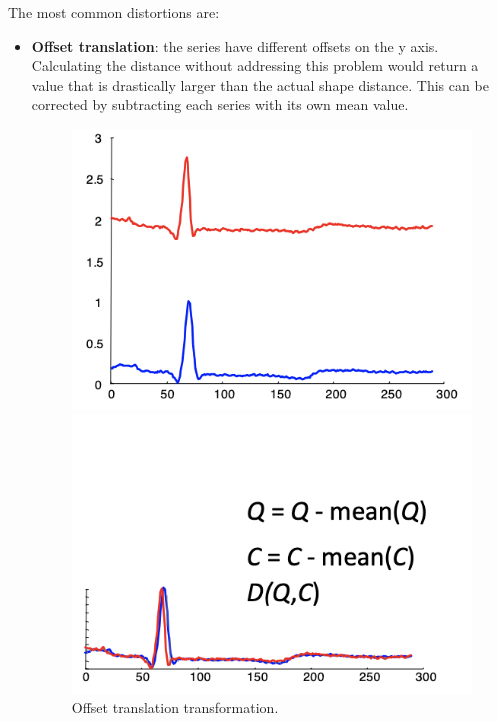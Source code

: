 The most common distortions are:
\begin{itemize}
    \item \textbf{Offset translation}: the series have different offsets on the y axis. Calculating the distance without addressing this problem would return a value that is drastically larger than the actual shape distance. This can be corrected by subtracting each series with its own mean value.
    \begin{figure}[h]
        \centering
        \begin{minipage}{0.40\textwidth}
         \includegraphics[width=1.0\linewidth]{img/offset_trans_1.png}
        \end{minipage}
        \hfill
        \begin{minipage}{0.40\textwidth}
            \includegraphics[width=1.0\linewidth]{img/offset_trans_2.png}
        \end{minipage}
        \label{fig:offset-trans}
        \caption{Offset translation transformation.}
    \end{figure}


\end{itemize}
